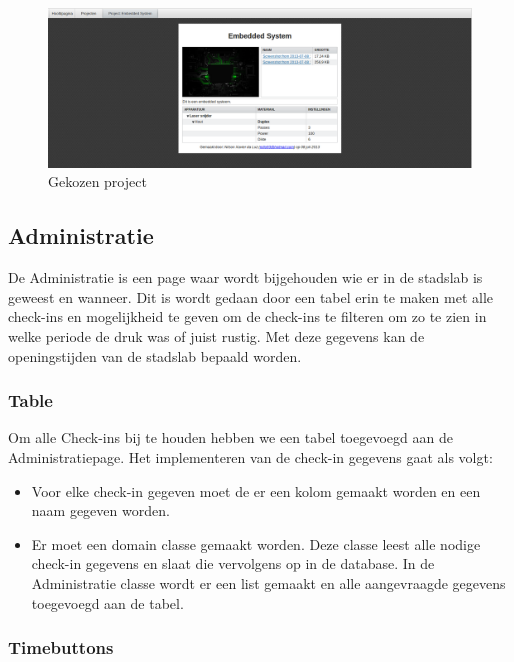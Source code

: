 \begin{figure}[Hh]
	\centering
	\includegraphics[width=1\textwidth]{Images/project.png}
	\caption{Gekozen project}
	\label{fig:chosen-project}
\end{figure}

\subsection{Administratie}
De Administratie is een page waar wordt bijgehouden wie er in de stadslab is geweest en wanneer. Dit is wordt gedaan door een tabel erin te maken met alle check-ins en mogelijkheid te geven om de check-ins te filteren om zo te zien in welke periode de druk was of juist rustig. Met deze gegevens kan de openingstijden van de stadslab bepaald worden.

\subsubsection{Table}

Om alle Check-ins bij te houden hebben we een tabel toegevoegd aan de Administratiepage. Het implementeren van de check-in gegevens gaat als volgt:

\begin {itemize}
\item Voor elke check-in gegeven moet de er een kolom gemaakt worden en een naam gegeven worden.
\item Er moet een domain classe gemaakt worden. Deze classe leest alle nodige check-in gegevens en slaat die vervolgens op in de database. In de Administratie classe wordt er een list gemaakt en alle aangevraagde gegevens toegevoegd aan de tabel.
\end {itemize}

\subsubsection{Timebuttons}

